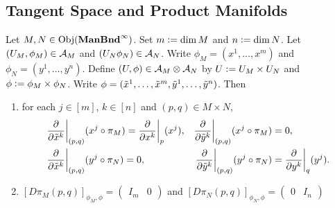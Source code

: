 \documentclass{book}
\begin{document}
	
	\subsection{Tangent Space and Product Manifolds}
	
	\begin{ex} 
		Let $M,N \in \operatorname{Obj}(\operatorname*{\text{\textbf{ManBnd}}^{\infty}})$. Set $m \vcentcolon= \dim M$ and $n \vcentcolon= \dim N$. Let $(U_M, \phi_M) \in \mathcal{A}_M$ and $(U_N\phi_N) \in \mathcal{A}_N$. Write $\phi_M = (x^1, \ldots, x^m)$ and $\phi_N = (y^1, \ldots, y^n)$. Define $(U, \phi) \in \mathcal{A}_M \otimes \mathcal{A}_N$ by $U \vcentcolon= U_M \times U_N$ and $\phi \vcentcolon= \phi_M \times \phi_N$. Write $\phi = (\tilde{x}^1, \ldots, \tilde{x}^m, \tilde{y}^1, \ldots, \tilde{y}^n)$. Then 
		\begin{enumerate}
			\item for each $j \in [m]$, $k \in [n]$ and $(p,q) \in M \times N$,
			\begin{align*}
				& \frac{\partial }{\partial \tilde{x}^k} \bigg|_{(p,q)} ( x^j \circ \pi_M ) = \frac{\partial}{\partial x^k} \bigg|_p (x^j), 
				& \frac{\partial }{\partial \tilde{y}^k} \bigg|_{(p,q)} ( x^j \circ \pi_M ) &= 0, \\
				& \frac{\partial }{\partial \tilde{x}^k} \bigg|_{(p,q)} ( y^j \circ \pi_N ) = 0, 
				& \frac{\partial }{\partial \tilde{y}^k} \bigg|_{(p,q)} ( y^j \circ \pi_N ) &=  \frac{\partial}{\partial y^k} \bigg|_q (y^j).
			\end{align*}
			\item $[D \pi_M (p,q)]_{\phi_M, \phi} = 
			\begin{pmatrix}
				I_m & 0
			\end{pmatrix}$
			and 
			$[D \pi_N (p,q)]_{\phi_N, \phi} = 
			\begin{pmatrix}
				0 & I_n
			\end{pmatrix}$
		\end{enumerate}
	\end{ex}
	
\end{document}
